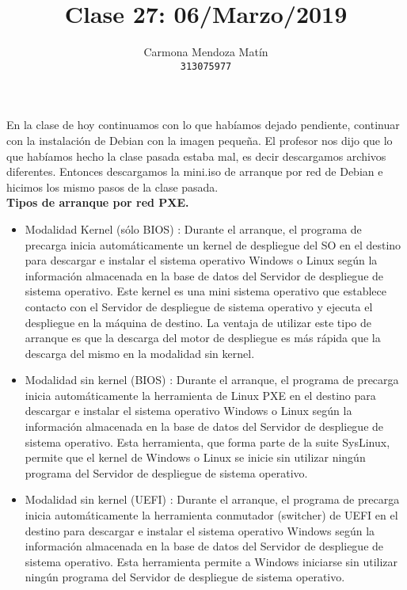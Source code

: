 \documentclass[11pt, a4paper]{report}
\begin{document}
\title{Clase 27: 06/Marzo/2019}
\author{
  Carmona Mendoza Mat\'in\\
  \texttt{313075977}
}
\date{}
\maketitle

En la clase de hoy continuamos con lo que habíamos dejado pendiente, continuar
con la instalación de Debian con la imagen pequeña. El profesor nos dijo que lo
que habíamos hecho la clase pasada estaba mal, es decir descargamos archivos
diferentes. Entonces descargamos la mini.iso de arranque por red de Debian e
hicimos los mismo pasos de la clase pasada.  \\

\textbf{Tipos de arranque por red PXE.} \\

\begin{itemize}
\item Modalidad Kernel (sólo BIOS) : Durante el arranque, el programa de
  precarga inicia automáticamente un kernel de despliegue del SO en el destino
  para descargar e instalar el sistema operativo Windows o Linux según la
  información almacenada en la base de datos del Servidor de despliegue de
  sistema operativo. Este kernel es una mini sistema operativo que establece
  contacto con el Servidor de despliegue de sistema operativo y ejecuta el
  despliegue en la máquina de destino. La ventaja de utilizar este tipo de
  arranque es que la descarga del motor de despliegue es más rápida que la
  descarga del mismo en la modalidad sin kernel.
\item Modalidad sin kernel (BIOS) : Durante el arranque, el programa de
  precarga inicia automáticamente la herramienta de Linux PXE en el destino
  para descargar e instalar el sistema operativo Windows o Linux según la
  información almacenada en la base de datos del Servidor de despliegue de
  sistema operativo. Esta herramienta, que forma parte de la suite SysLinux,
  permite que el kernel de Windows o Linux se inicie sin utilizar ningún
  programa del Servidor de despliegue de sistema operativo. 
\item Modalidad sin kernel (UEFI) : Durante el arranque, el programa de
  precarga inicia automáticamente la herramienta conmutador (switcher) de UEFI
  en el destino para descargar e instalar el sistema operativo Windows según la
  información almacenada en la base de datos del Servidor de despliegue de
  sistema operativo. Esta herramienta permite a Windows iniciarse sin utilizar
  ningún programa del Servidor de despliegue de sistema operativo.  
\end{itemize}
\end{document}
